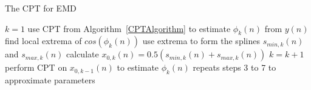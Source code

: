 \documentclass[a4paper]{IEEEtran}
\begin{document}
\begin{algorithm}
\caption{The CPT for EMD}\label{CPTEMDAlgorithm}
\begin{algorithmic}[1]
\State $k=1$
\State use CPT from Algorithm~\ref{CPTAlgorithm} to estimate $\phi_k(n)$ from $y(n)$
\State find local extrema of $cos\left(\phi_k(n)\right)$
\State use extrema to form the splines $s_{min,k}(n)$ and $s_{max,k}(n)$
\State calculate $x_{0,k}(n) = 0.5\left(s_{min,k}(n) + s_{max,k}(n)\right)$
    \State $k=k+1$
    \State perform CPT on $x_{0,k-1}(n)$ to estimate $\phi_{k}(n)$
    \State repeats steps 3 to 7 to approximate parameters
\EndWhile
\end{algorithmic}
\end{algorithm}

\end{document}
